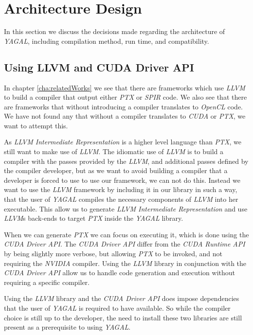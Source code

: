 \section{Architecture Design}
In this section we discuss the decisions made regarding the architecture of \textit{YAGAL}, including compilation method, run time, and compatibility.

\subsection{Using LLVM and CUDA Driver API}
In chapter \ref{cha:relatedWorks} we see that there are frameworks which use \textit{LLVM} to build a compiler that output either \textit{PTX} or \textit{SPIR} code. We also see that there are frameworks that without introducing a compiler translates to \textit{OpenCL} code. We have not found any that without a compiler translates to \textit{CUDA} or \textit{PTX}, we want to attempt this.

As \textit{LLVM Intermediate Representation} is a higher level language than \textit{PTX}, we still want to make use of \textit{LLVM}. The idiomatic use of \textit{LLVM} is to build a compiler with the passes provided by the \textit{LLVM}, and additional passes defined by the compiler developer, but as we want to avoid building a compiler that a developer is forced to use to use our framework, we can not do this. Instead we want to use the \textit{LLVM} framework by including it in our library in such a way, that the user of \textit{YAGAL} compiles the necessary components of \textit{LLVM} into her executable. This allow us to generate \textit{LLVM Intermediate Representation} and use \textit{LLVM}s back-ends to target \textit{PTX} inside the \textit{YAGAL} library.

When we can generate \textit{PTX} we can focus on executing it, which is done using the \textit{CUDA Driver API}. The \textit{CUDA Driver API} differ from the \textit{CUDA Runtime API} by being slightly more verbose, but allowing \textit{PTX} to be invoked, and not requiring the \textit{NVIDIA} compiler. Using the \textit{LLVM} library in conjunction with the \textit{CUDA Driver API} allow us to handle code generation and execution without requiring a specific compiler.

Using the \textit{LLVM} library and the \textit{CUDA Driver API} does impose dependencies that the user of \textit{YAGAL} is required to have available. So while the compiler choice is still up to the developer, the need to install these two libraries are still present as a prerequisite to using \textit{YAGAL}.

